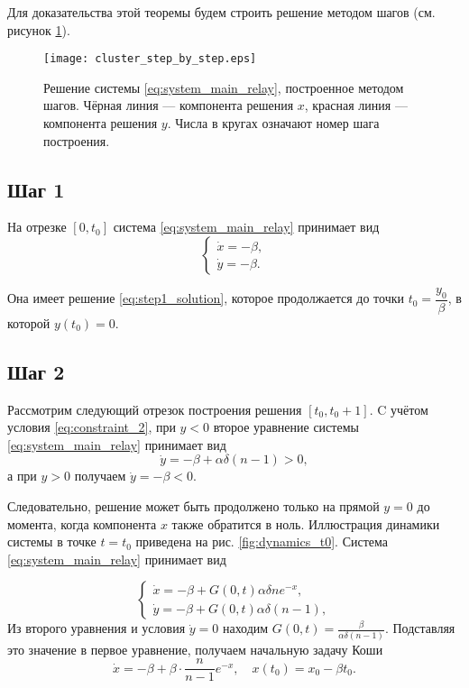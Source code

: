 Для доказательства этой теоремы будем строить решение методом шагов (см. рисунок \ref{fig:cluster_step_by_step}).

\begin{figure}[!ht]
	\centering
	\texttt{[image: cluster\_step\_by\_step.eps]}
	\caption{Решение системы \eqref{eq:system_main_relay}, построенное методом шагов. Чёрная линия --- компонента решения $x$, красная линия --- компонента решения $y$. Числа в кругах означают номер шага построения.}
	\label{fig:cluster_step_by_step}
\end{figure}


\subsection{Шаг 1}
На отрезке $[0, t_0]$ система \eqref{eq:system_main_relay} принимает вид
%
\begin{equation}
	\label{eq:step1_system}
	\begin{cases}
		\dot{x} = -\beta,\\
		\dot{y} = -\beta.
	\end{cases}
\end{equation}

Она имеет решение \eqref{eq:step1_solution}, которое продолжается до точки $t_0 = \dfrac{y_0}{\beta}$, в которой $y(t_0) = 0$.

\subsection{Шаг 2}

Рассмотрим следующий отрезок построения решения $[t_0, t_0 + 1]$. C учётом условия \eqref{eq:constraint_2}, при $y < 0$ второе уравнение системы \eqref{eq:system_main_relay} принимает вид
\[
\dot{y} = -\beta + \alpha \delta (n - 1) > 0,
\]
а при $y > 0$ получаем $\dot{y} = -\beta < 0$.

Следовательно, решение может быть продолжено только на прямой $y = 0$ до момента, когда компонента $x$ также обратится в ноль. Иллюстрация динамики системы в точке $t= t_0$ приведена на рис. \ref{fig:dynamics_t0}. Система \eqref{eq:system_main_relay} принимает вид

\begin{equation}
	\label{eq:step2_system}
	\begin{cases}
		\dot{x} = -\beta + G(0, t) \alpha \delta n e^{-x},\\
		\dot{y} = -\beta + G(0, t) \alpha \delta (n - 1),
	\end{cases}
\end{equation}
%
Из второго уравнения и условия $\dot{y} = 0$ находим $G(0, t) = \frac{\beta}{\alpha \delta (n - 1)}$. Подставляя это значение в первое уравнение, получаем начальную задачу Коши
\begin{equation}
	\label{eq:step2_start}
	\dot{x} = -\beta + \beta\cdot\dfrac{n}{n - 1}e^{-x}, \quad x(t_0) = x_0 - \beta t_0.
\end{equation}

